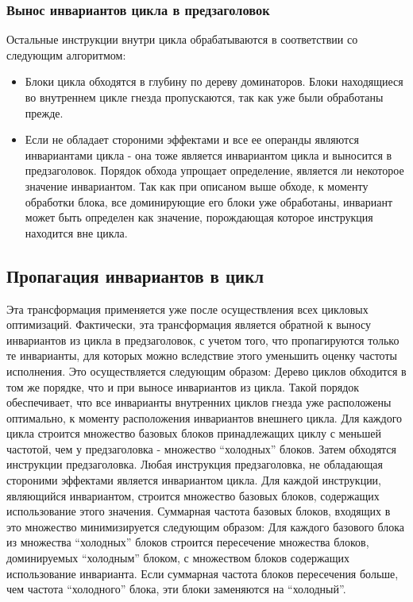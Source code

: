 \subsubsection{Вынос инвариантов цикла в предзаголовок}

Остальные инструкции внутри цикла обрабатываются в соответствии со следующим алгоритмом:
\begin{itemize}
    \item Блоки цикла обходятся в глубину по дереву доминаторов.
        Блоки находящиеся во внутреннем цикле гнезда пропускаются, так как уже были обработаны прежде.
    \item Если не обладает стороними эффектами и все ее операнды являются инвариантами цикла - она тоже является инвариантом цикла и выносится в предзаголовок.
        Порядок обхода упрощает определение, является ли некоторое значение инвариантом.
        Так как при описаном выше обходе, к моменту обработки блока, все доминирующие его блоки уже обработаны, инвариант может быть определен как значение, порождающая которое инструкция находится вне цикла.
\end{itemize}

\subsection{Пропагация инвариантов в цикл}

Эта трансформация применяется уже после осуществления всех цикловых оптимизаций.
Фактически, эта трансформация является обратной к выносу инвариантов из цикла в предзаголовок, с учетом того, что пропагируются только те инварианты, для которых можно вследствие этого уменьшить оценку частоты исполнения.
Это осуществляется следующим образом:
Дерево циклов обходится в том же порядке, что и при выносе инвариантов из цикла.
Такой порядок обеспечивает, что все инварианты внутренних циклов гнезда уже расположены оптимально, к моменту расположения инвариантов внешнего цикла.
Для каждого цикла строится множество базовых блоков принадлежащих циклу с меньшей частотой, чем у предзаголовка - множество \enquote{холодных} блоков.
Затем обходятся инструкции предзаголовка.
Любая инструкция предзаголовка, не обладающая стороними эффектами является инвариантом цикла.
Для каждой инструкции, являющийся инвариантом, строится множество базовых блоков, содержащих использование этого значения.
Суммарная частота базовых блоков, входящих в это множество минимизируется следующим образом:
Для каждого базового блока из множества \enquote{холодных} блоков строится пересечение множества блоков, доминируемых \enquote{холодным} блоком, с множеством блоков содержащих использование инварианта.
Если суммарная частота блоков пересечения больше, чем частота \enquote{холодного} блока, эти блоки заменяются на \enquote{холодный}.

